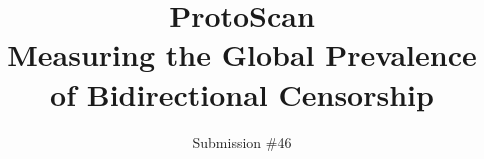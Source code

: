 \documentclass[letterpaper,twocolumn,10pt]{article}
\begin{document}
\pagestyle{plain} %


\renewcommand{\sectionautorefname}{\S}
\renewcommand{\subsectionautorefname}{\S}
\renewcommand{\subsubsectionautorefname}{\S}
\date{}

\setlength{\droptitle}{-5em}   %
\posttitle{\par\end{center}}   %
\title{{\bf ProtoScan}\\\Large{Measuring the Global Prevalence of Bidirectional Censorship}}
\author{Submission \#46}


\maketitle

\begin{abstract}
 
\end{abstract}



%





% 

% 

% 








% 
\end{document}
